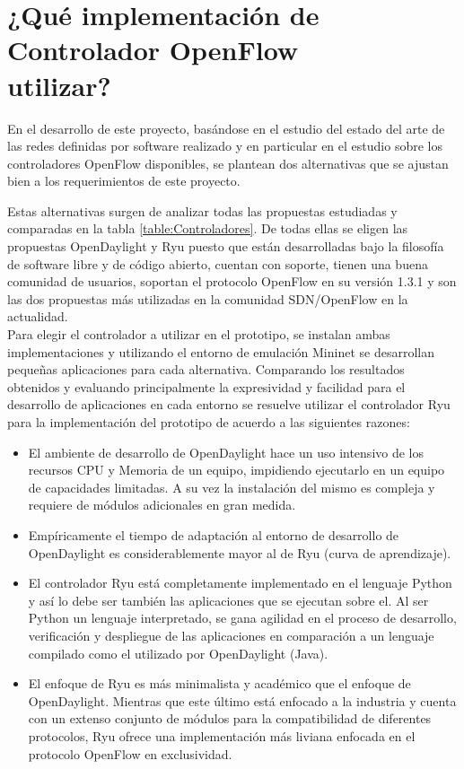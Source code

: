 \section[¿Qu\'e implementaci\'on de Controlador OpenFlow utilizar?]{¿Qu\'e implementaci\'on de Controlador OpenFlow \\ utilizar?}
En el desarrollo de este proyecto, basándose en el estudio del estado del arte de las redes definidas por software realizado y en particular en el estudio sobre los controladores OpenFlow disponibles, se plantean dos alternativas que se ajustan bien a los requerimientos de este proyecto.

Estas alternativas surgen de analizar todas las propuestas estudiadas y comparadas en la tabla \ref{table:Controladores}. De todas ellas se eligen las propuestas OpenDaylight y Ryu puesto que est\'an desarrolladas bajo la filosofía de software libre y de código abierto, cuentan con soporte, tienen una buena comunidad de usuarios, soportan el protocolo OpenFlow en su versi\'on 1.3.1 y son las dos propuestas m\'as utilizadas en la comunidad SDN/OpenFlow en la actualidad.\\

Para elegir el controlador a utilizar en el prototipo, se instalan ambas implementaciones y utilizando el entorno de emulación Mininet se desarrollan pequeñas aplicaciones para cada alternativa. Comparando los resultados obtenidos y evaluando principalmente la expresividad y facilidad para el desarrollo de aplicaciones en cada entorno se resuelve utilizar el controlador Ryu para la implementaci\'on del prototipo de acuerdo a las siguientes razones:

\begin{itemize}
\item El ambiente de desarrollo de OpenDaylight hace un uso intensivo de los recursos CPU y Memoria de un equipo, impidiendo ejecutarlo en un equipo de capacidades limitadas. A su vez la instalaci\'on del mismo es compleja y requiere de m\'odulos adicionales en gran medida.

\item Empíricamente el tiempo de adaptaci\'on al entorno de desarrollo de OpenDaylight es considerablemente mayor al de Ryu (curva de aprendizaje).  

\item El controlador Ryu est\'a completamente implementado en el lenguaje Python y as\'i lo debe ser también las aplicaciones que se ejecutan sobre el. Al ser Python un lenguaje interpretado, se gana agilidad en el proceso de desarrollo, verificaci\'on y despliegue de las aplicaciones en comparaci\'on a un lenguaje compilado como el utilizado por OpenDaylight (Java).

\item El enfoque de Ryu es m\'as minimalista y académico que el enfoque de OpenDaylight. Mientras que este \'ultimo est\'a enfocado a la industria y cuenta con un extenso conjunto de módulos para la compatibilidad de diferentes protocolos, Ryu ofrece una implementaci\'on m\'as liviana enfocada en el protocolo OpenFlow en exclusividad. 
\end{itemize}  
